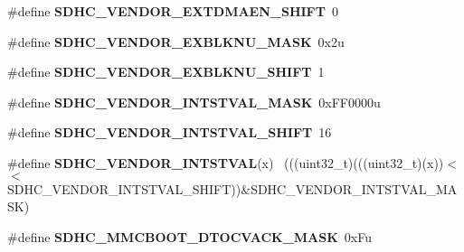 \begin{DoxyCompactItemize}
\item 
\hypertarget{group___s_d_h_c___register___masks_ga983ed2560d2e6ab70865f447d0519d07}{}\#define {\bfseries S\+D\+H\+C\+\_\+\+V\+E\+N\+D\+O\+R\+\_\+\+E\+X\+T\+D\+M\+A\+E\+N\+\_\+\+S\+H\+I\+F\+T}~0\label{group___s_d_h_c___register___masks_ga983ed2560d2e6ab70865f447d0519d07}

\item 
\hypertarget{group___s_d_h_c___register___masks_gaa0a0cbb02b6172ad044e259017665d02}{}\#define {\bfseries S\+D\+H\+C\+\_\+\+V\+E\+N\+D\+O\+R\+\_\+\+E\+X\+B\+L\+K\+N\+U\+\_\+\+M\+A\+S\+K}~0x2u\label{group___s_d_h_c___register___masks_gaa0a0cbb02b6172ad044e259017665d02}

\item 
\hypertarget{group___s_d_h_c___register___masks_gafc7b41b0f492ed43f488063697000cf3}{}\#define {\bfseries S\+D\+H\+C\+\_\+\+V\+E\+N\+D\+O\+R\+\_\+\+E\+X\+B\+L\+K\+N\+U\+\_\+\+S\+H\+I\+F\+T}~1\label{group___s_d_h_c___register___masks_gafc7b41b0f492ed43f488063697000cf3}

\item 
\hypertarget{group___s_d_h_c___register___masks_ga59d8694a1bf1d55be388439ed4419ab3}{}\#define {\bfseries S\+D\+H\+C\+\_\+\+V\+E\+N\+D\+O\+R\+\_\+\+I\+N\+T\+S\+T\+V\+A\+L\+\_\+\+M\+A\+S\+K}~0x\+F\+F0000u\label{group___s_d_h_c___register___masks_ga59d8694a1bf1d55be388439ed4419ab3}

\item 
\hypertarget{group___s_d_h_c___register___masks_ga3610161a11c6ef0ef2849ef4fca8d12f}{}\#define {\bfseries S\+D\+H\+C\+\_\+\+V\+E\+N\+D\+O\+R\+\_\+\+I\+N\+T\+S\+T\+V\+A\+L\+\_\+\+S\+H\+I\+F\+T}~16\label{group___s_d_h_c___register___masks_ga3610161a11c6ef0ef2849ef4fca8d12f}

\item 
\hypertarget{group___s_d_h_c___register___masks_ga896de665b6137f55b442bbd40a4a4b68}{}\#define {\bfseries S\+D\+H\+C\+\_\+\+V\+E\+N\+D\+O\+R\+\_\+\+I\+N\+T\+S\+T\+V\+A\+L}(x)                                ~(((uint32\+\_\+t)(((uint32\+\_\+t)(x))$<$$<$S\+D\+H\+C\+\_\+\+V\+E\+N\+D\+O\+R\+\_\+\+I\+N\+T\+S\+T\+V\+A\+L\+\_\+\+S\+H\+I\+F\+T))\&S\+D\+H\+C\+\_\+\+V\+E\+N\+D\+O\+R\+\_\+\+I\+N\+T\+S\+T\+V\+A\+L\+\_\+\+M\+A\+S\+K)\label{group___s_d_h_c___register___masks_ga896de665b6137f55b442bbd40a4a4b68}

\item 
\hypertarget{group___s_d_h_c___register___masks_ga243f17fb68ebb17a8a62a31a34530a1f}{}\#define {\bfseries S\+D\+H\+C\+\_\+\+M\+M\+C\+B\+O\+O\+T\+\_\+\+D\+T\+O\+C\+V\+A\+C\+K\+\_\+\+M\+A\+S\+K}~0x\+Fu\label{group___s_d_h_c___register___masks_ga243f17fb68ebb17a8a62a31a34530a1f}


\end{DoxyCompactItemize}
